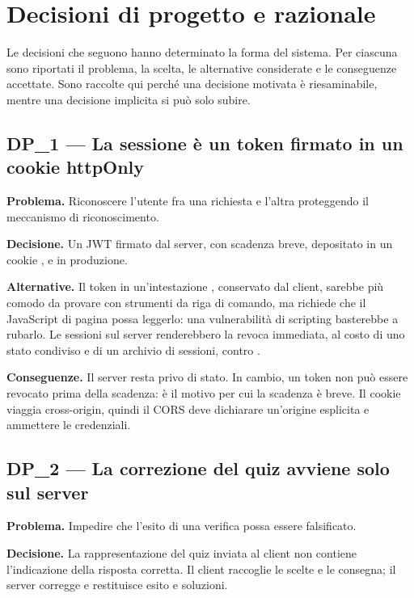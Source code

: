 \chapter{Decisioni di progetto e razionale}
\label{cap:sdd-decisioni}

Le decisioni che seguono hanno determinato la forma del sistema. Per ciascuna
sono riportati il problema, la scelta, le alternative considerate e le
conseguenze accettate. Sono raccolte qui perché una decisione motivata è
riesaminabile, mentre una decisione implicita si può solo subire.

\section{DP\_1 — La sessione è un token firmato in un cookie httpOnly}

\textbf{Problema.} Riconoscere l'utente fra una richiesta e l'altra
proteggendo il meccanismo di riconoscimento.

\textbf{Decisione.} Un JWT firmato dal server, con scadenza breve, depositato
in un cookie ,  e  in produzione.

\textbf{Alternative.} Il token in un'intestazione ,
conservato dal client, sarebbe più comodo da provare con strumenti da riga di
comando, ma richiede che il JavaScript di pagina possa leggerlo: una
vulnerabilità di scripting basterebbe a rubarlo. Le sessioni sul server
renderebbero la revoca immediata, al costo di uno stato condiviso e di un
archivio di sessioni, contro .

\textbf{Conseguenze.} Il server resta privo di stato. In cambio, un token non
può essere revocato prima della scadenza: è il motivo per cui la scadenza è
breve. Il cookie viaggia cross-origin, quindi il CORS deve dichiarare
un'origine esplicita e ammettere le credenziali.

\section{DP\_2 — La correzione del quiz avviene solo sul server}

\textbf{Problema.} Impedire che l'esito di una verifica possa essere
falsificato.

\textbf{Decisione.} La rappresentazione del quiz inviata al client non
contiene l'indicazione della risposta corretta. Il client raccoglie le scelte
e le consegna; il server corregge e restituisce esito e soluzioni.

